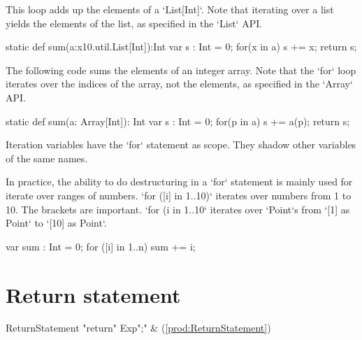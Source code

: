 \begin{ex}
This loop adds up the elements of a \xcd`List[Int]`.
Note that iterating over a list yields the elements of the list, as specified
in the \xcd`List` API. 
\begin{xten}
static def sum(a:x10.util.List[Int]):Int {
  var s : Int = 0;
  for(x in a) s += x;
  return s;
}
\end{xten}

The following code sums the elements of an integer array.  Note that the
\xcd`for` loop iterates over the indices of the array, not the elements, as
specified in the \xcd`Array` API.  
\begin{xten}
static def sum(a: Array[Int]): Int {
  var s : Int = 0;
  for(p in a) s += a(p);
  return s;
}
\end{xten}



\end{ex}

Iteration variables have the \xcd`for` statement as scope.  They shadow other
variables of the same names.

\begin{ex}
In practice, the ability to do destructuring in a \xcd`for` statement is
mainly used for iterate over ranges of numbers.  
\xcd`for ([i] in 1..10)` iterates over numbers from 1 to 10.
The brackets are important. 
\xcd`for (i in 1..10` iterates over \xcd`Point`s from 
\xcd`[1] as Point` to \xcd`[10] as Point`.


\begin{xten}
  var sum : Int = 0;
  for ([i] in 1..n) sum += i;
\end{xten}
\end{ex}


\section{Return statement}
\label{ReturnStatement}

\begin{bbgrammar}
     ReturnStatement \: \xcd"return" Exp\opt \xcd";" & (\ref{prod:ReturnStatement}) \\
\end{bbgrammar}

